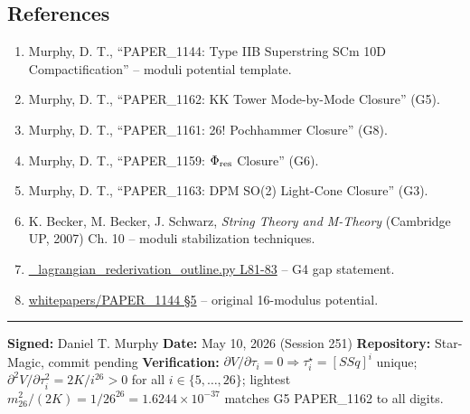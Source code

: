 \documentclass[
]{article}
\providecommand{\tightlist}{%
  \setlength{\itemsep}{0pt}\setlength{\parskip}{0pt}}
\begin{document}
\subsection{References}\label{references}

\begin{enumerate}
\def\labelenumi{\arabic{enumi}.}
\tightlist
\item
  Murphy, D. T., ``PAPER\_1144: Type IIB Superstring SCm 10D
  Compactification'' -- moduli potential template.
\item
  Murphy, D. T., ``PAPER\_1162: KK Tower Mode-by-Mode Closure'' (G5).
\item
  Murphy, D. T., ``PAPER\_1161: 26! Pochhammer Closure'' (G8).
\item
  Murphy, D. T., ``PAPER\_1159: \(\Phi_{\rm res}\) Closure'' (G6).
\item
  Murphy, D. T., ``PAPER\_1163: DPM SO(2) Light-Cone Closure'' (G3).
\item
  K. Becker, M. Becker, J. Schwarz, \emph{String Theory and M-Theory}
  (Cambridge UP, 2007) Ch. 10 -- moduli stabilization techniques.
\item
  \href{_lagrangian_rederivation_outline.py\#L81}{\_lagrangian\_rederivation\_outline.py
  L81-83} -- G4 gap statement.
\item
  \href{whitepapers/PAPER_1144_Type_IIB_Superstring_SCm_10D_Compactification.md\#L62}{whitepapers/PAPER\_1144
  §5} -- original 16-modulus potential.
\end{enumerate}

\begin{center}\rule{0.5\linewidth}{0.5pt}\end{center}

\textbf{Signed:} Daniel T. Murphy \textbf{Date:} May 10, 2026 (Session
251) \textbf{Repository:} Star-Magic, commit pending
\textbf{Verification:}
\(\partial V/\partial \tau_i = 0 \Rightarrow \tau_i^\star
= [SSq]^i\) unique; \(\partial^2 V/\partial \tau_i^2 = 2K/i^{26} > 0\)
for all \(i \in \{5,\dots,26\}\); lightest \(m_{26}^2/(2K) = 1/26^{26}
= 1.6244\times 10^{-37}\) matches G5 PAPER\_1162 to all digits.
\end{document}
